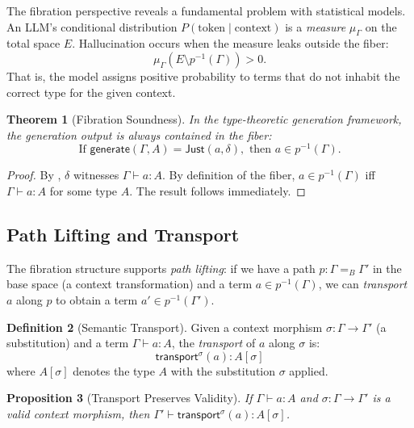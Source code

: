 \documentclass[11pt,a4paper]{article}
\theoremstyle{plain}
\newtheorem{theorem}{Theorem}[section]
\newtheorem{proposition}[theorem]{Proposition}
\theoremstyle{definition}
\newtheorem{definition}[theorem]{Definition}
\theoremstyle{remark}
\newcommand{\transport}{\mathsf{transport}}
\begin{document}
The fibration perspective reveals a fundamental problem with statistical models.
An LLM's conditional distribution $P(\text{token} \mid \text{context})$ is a \emph{measure} $\mu_\Gamma$ on the total space $E$.
Hallucination occurs when the measure leaks outside the fiber:
\begin{equation}\label{eq:hallucination-measure}
  \mu_\Gamma(E \setminus p^{-1}(\Gamma)) > 0.
\end{equation}
That is, the model assigns positive probability to terms that do not inhabit the correct type for the given context.

\begin{theorem}[Fibration Soundness]\label{thm:fibration-soundness}
In the type-theoretic generation framework, the generation output is always contained in the fiber:
\[
  \text{If } \mathsf{generate}(\Gamma, A) = \mathsf{Just}(a, \delta), \text{ then } a \in p^{-1}(\Gamma).
\]
\end{theorem}

\begin{proof}
By , $\delta$ witnesses $\Gamma \vdash a : A$.
By definition of the fiber, $a \in p^{-1}(\Gamma)$ iff $\Gamma \vdash a : A$ for some type $A$.
The result follows immediately.
\end{proof}

\subsection{Path Lifting and Transport}

The fibration structure supports \emph{path lifting}: if we have a path $p : \Gamma =_B \Gamma'$ in the base space (a context transformation) and a term $a \in p^{-1}(\Gamma)$, we can \emph{transport} $a$ along $p$ to obtain a term $a' \in p^{-1}(\Gamma')$.

\begin{definition}[Semantic Transport]\label{def:transport}
Given a context morphism $\sigma : \Gamma \to \Gamma'$ (a substitution) and a term $\Gamma \vdash a : A$, the \emph{transport} of $a$ along $\sigma$ is:
\[
  \transport^\sigma(a) : A[\sigma]
\]
where $A[\sigma]$ denotes the type $A$ with the substitution $\sigma$ applied.
\end{definition}

\begin{proposition}[Transport Preserves Validity]\label{prop:transport-valid}
If $\Gamma \vdash a : A$ and $\sigma : \Gamma \to \Gamma'$ is a valid context morphism, then $\Gamma' \vdash \transport^\sigma(a) : A[\sigma]$.
\end{proposition}
\end{document}
